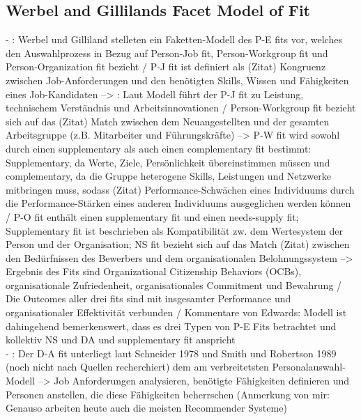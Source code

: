 \subsection{Werbel and Gillilands Facet Model of Fit}
\label{ch:notizen:rekcruitingUndSelektion:werbel}
- \cite[S. 37]{edwards:2008}: Werbel und Gilliland stelleten ein Faketten-Modell des P-E fits vor, welches den Auswahlprozess in Bezug auf Person-Job fit, Person-Workgroup fit und Person-Organization fit bezieht / P-J fit ist definiert als (Zitat) Kongruenz zwischen Job-Anforderungen und den benötigten Skills, Wissen und Fähigkeiten eines Job-Kandidaten --> \cite[S. 38]{edwards:2008}: Laut 
Modell führt der P-J fit zu Leistung, technischem Verständnis und Arbeitsinnovationen / Person-Workgroup fit bezieht sich auf das (Zitat) Match zwischen dem Neuangestellten und der gesamten Arbeitsgruppe (z.B. Mitarbeiter und Führungskräfte) --> P-W fit wird sowohl durch einen supplementary als auch einen complementary fit bestimmt: Supplementary, da Werte, Ziele, Persönlichkeit übereinstimmen müssen und complementary, da die Gruppe heterogene Skills, Leistungen und Netzwerke mitbringen muss, sodass (Zitat) Performance-Schwächen eines Individuums durch die Performance-Stärken eines anderen Individuums ausgeglichen werden können / P-O fit enthält einen supplementary fit und einen needs-supply fit; Supplementary fit ist beschrieben als Kompatibilität zw. dem Wertesystem der Person und der Organisation; NS fit bezieht sich auf das Match (Zitat) zwischen den Bedürfnissen des Bewerbers und dem organisationalen Belohnungssystem --> Ergebnis des Fits sind Organizational Citizenship Behaviors (OCBs), organisationale Zufriedenheit, organisationales Commitment und Bewahrung / Die Outcomes aller drei fits sind mit insgesamter Performance und organisationaler Effektivität verbunden / Kommentare von Edwards: Modell ist dahingehend bemerkenswert, dass es drei Typen von P-E Fits betrachtet und kollektiv NS und DA und supplementary fit anspricht\\
- \cite[S. 3]{edwards:1990}: Der D-A fit unterliegt laut Schneider 1978 und Smith und Robertson 1989 (noch nicht nach Quellen recherchiert) dem am verbreitetsten Personalauswahl-Modell --> Job Anforderungen analysieren, benötigte Fähigkeiten definieren und Personen anstellen, die diese Fähigkeiten beherrschen (Anmerkung von mir: Genauso arbeiten heute auch die meisten Recommender Systeme) \\

